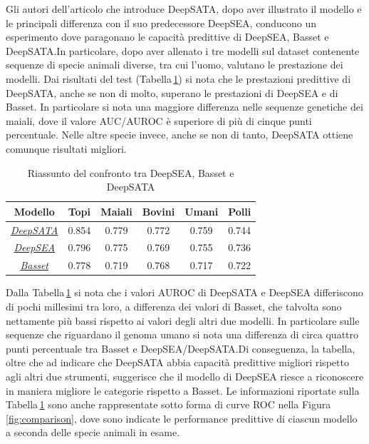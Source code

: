 Gli autori dell'articolo che introduce DeepSATA, dopo aver illustrato il modello e le principali differenza con il suo predecessore DeepSEA, conducono un esperimento dove paragonano le capacità predittive di DeepSEA, Basset e DeepSATA.\@ In particolare, dopo aver allenato i tre modelli sul dataset contenente sequenze di specie animali diverse, tra cui l'uomo, valutano le prestazione dei modelli. Dai risultati del test (Tabella\,\ref{tab:comparison}) si nota che le prestazioni predittive di DeepSATA, anche se non di molto, superano le prestazioni di DeepSEA e di Basset. In particolare si nota una maggiore differenza nelle sequenze genetiche dei maiali, dove il valore \acs{AUC}/\acs{AUROC} è superiore di più di cinque punti percentuale. Nelle altre specie invece, anche se non di tanto, DeepSATA ottiene comunque risultati migliori.
\begin{table}[!h]
    \centering
    \caption{Riassunto del confronto tra DeepSEA, Basset e DeepSATA}\label{tab:comparison}
    \renewcommand{\arraystretch}{2}
    \begin{tabular}{|c|c|c|c|c|c|} %
        \hline %
        \textbf{Modello} & \textbf{Topi} & \textbf{Maiali} & \textbf{Bovini} & \textbf{Umani} & \textbf{Polli}\\ 
        \hline\hline %
        \hyperref[sec:DeepSATA]{\textsl{DeepSATA}} & 0.854 & 0.779 & 0.772 & 0.759 & 0.744 \\ 
        \hyperref[sec:DeepSEA]{\textsl{DeepSEA}} & 0.796 & 0.775 & 0.769 & 0.755 & 0.736 \\ 
        \hyperref[sec:Basset]{\textsl{Basset}} & 0.778 & 0.719 & 0.768 & 0.717 & 0.722 \\ 
        \hline
    \end{tabular}
    \renewcommand{\arraystretch}{1}
\end{table}
Dalla Tabella\,\ref{tab:comparison} si nota che i valori \acs{AUROC} di DeepSATA e DeepSEA differiscono di pochi  millesimi tra loro, a differenza dei valori di Basset, che talvolta sono nettamente più bassi rispetto ai valori degli altri due modelli. In particolare sulle sequenze che riguardano il genoma umano si nota una differenza di circa quattro punti percentuale tra Basset e DeepSEA/DeepSATA.\@ Di conseguenza, la tabella, oltre che ad indicare che DeepSATA abbia capacità predittive migliori rispetto agli altri due strumenti, suggerisce che il modello di DeepSEA riesce a riconoscere in maniera migliore le categorie rispetto a Basset. Le informazioni riportate sulla Tabella\,\ref{tab:comparison} sono anche rappresentate sotto forma di curve \acs{ROC} nella Figura\,\ref{fig:comparison}, dove sono indicate le performance predittive di ciascun modello a seconda delle specie animali in esame.


